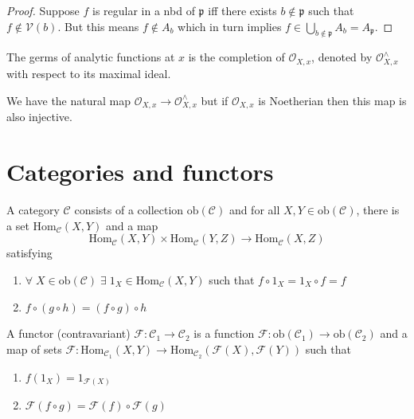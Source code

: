 \documentclass[oneside, 12pt, ]{scrbook}
\newcommand{\V}{\mathcal{V}}
\newcommand{\pr}{\mathfrak{p}}
\theoremstyle{theorem}
\begin{document}
\begin{proof}
Suppose $f$ is regular in a nbd of $\pr$ iff there exists $b \not \in \pr $ such that $f \not \in \V(b)$. But this means $f \not \in A_{b}$ which in turn implies $f \in \bigcup_{b \not \in \pr} A_{b} = A_{\pr}$.
\end{proof}

\begin{definition}
The germs of analytic functions at $x$ is the completion of $\mathcal{O}_{X,x}$, denoted by $\mathcal{O}_{X,x}^{\wedge}$ with respect to its maximal ideal. 
\end{definition}

\begin{remark}
We have the natural map $\mathcal{O}_{X,x} \rightarrow \mathcal{O}_{X,x}^{\wedge}$ but if $\mathcal{O}_{X,x}$ is Noetherian then this map is also injective. 
\end{remark}

\section{Categories and functors}

A category $\mathcal{C}$ consists of a collection $\mathrm{ob}(\mathcal{C})$ and for all $X,Y \in \mathrm{ob}(\mathcal{C})$, there is a set $\mathrm{Hom}_{\mathcal{C}}(X,Y)$ and a map $$\mathrm{Hom}_{\mathcal{C}}(X,Y) \times \mathrm{Hom}_{\mathcal{C}}(Y,Z) \rightarrow \mathrm{Hom}_{\mathcal{C}}(X,Z)$$ satisfying 
\begin{enumerate}
\item $\forall \; X \in \mathrm{ob}(\mathcal{C}) \; \exists \; 1_{X} \in \mathrm{Hom}_{\mathcal{C}}(X,Y)$ such that $f \circ 1_{X} = 1_{X} \circ f = f$
\item $f \circ (g \circ h) = (f \circ g)\circ h$
\end{enumerate}

A functor (contravariant) $\mathcal{F}: \mathcal{C}_{1} \rightarrow \mathcal{C}_{2}$ is a function $\mathcal{F}: \mathrm{ob}(\mathcal{C}_{1}) \rightarrow \mathrm{ob}(\mathcal{C}_{2})$ and a map of sets $\mathcal{F}: \mathrm{Hom}_{\mathcal{C}_{1}}(X,Y)\rightarrow \mathrm{Hom}_{\mathcal{C}_{2}}(\mathcal{F}(X),\mathcal{F}(Y))$ such that 
\begin{enumerate}
\item $f(1_{X}) = 1_{\mathcal{F}(X)}$
\item $\mathcal{F}(f \circ g) = \mathcal{F}(f) \circ \mathcal{F}(g)$
\end{enumerate}
\end{document}
